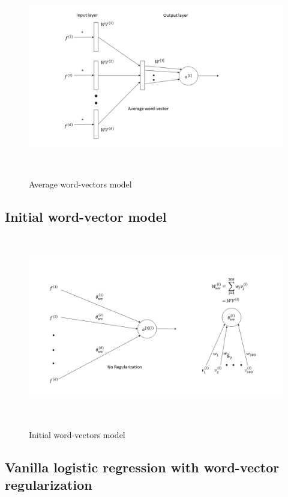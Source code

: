 \begin{figure}[htbp]
\centering
\includegraphics[width=16cm, height=8cm]{images/average-vectors2.png}\\
\centering
\caption{Average word-vectors model}
\label{fig:foo}
\end{figure}

\newpage
\subsection{Initial word-vector model}

\begin{figure}[htbp]
\centering
\includegraphics[width=16cm, height=8cm]{images/init-wv.png}\\
\centering
\caption{Initial word-vectors model}
\label{fig:foo}
\end{figure}

\newpage
\subsection{Vanilla logistic regression with word-vector regularization}

